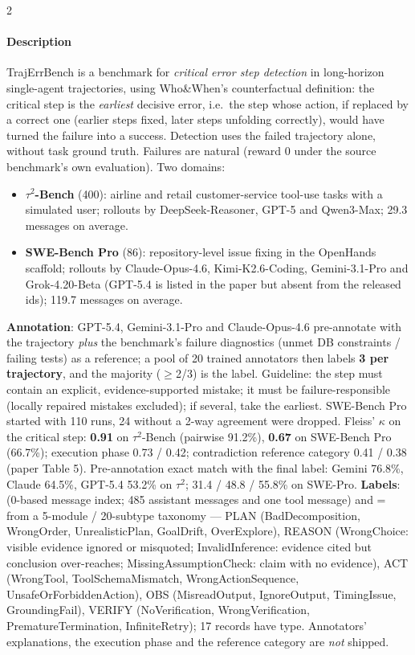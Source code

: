 \begin{multicols}{2}
\paragraph{Description} TrajErrBench is a benchmark for \emph{critical error step detection} in long-horizon single-agent trajectories, using Who\&When's counterfactual definition: the critical step is the \emph{earliest} decisive error, i.e.\ the step whose action, if replaced by a correct one (earlier steps fixed, later steps unfolding correctly), would have turned the failure into a success. Detection uses the failed trajectory alone, without task ground truth. Failures are natural (reward 0 under the source benchmark's own evaluation). Two domains:
\begin{itemize}
\item \textbf{$\tau^2$-Bench} (400): airline and retail customer-service tool-use tasks with a simulated user; rollouts by DeepSeek-Reasoner, GPT-5 and Qwen3-Max; 29.3 messages on average.
\item \textbf{SWE-Bench Pro} (86): repository-level issue fixing in the OpenHands scaffold; rollouts by Claude-Opus-4.6, Kimi-K2.6-Coding, Gemini-3.1-Pro and Grok-4.20-Beta (GPT-5.4 is listed in the paper but absent from the released ids); 119.7 messages on average.
\end{itemize}
\textbf{Annotation}: GPT-5.4, Gemini-3.1-Pro and Claude-Opus-4.6 pre-annotate with the trajectory \emph{plus} the benchmark's failure diagnostics (unmet DB constraints / failing tests) as a reference; a pool of 20 trained annotators then labels \textbf{3 per trajectory}, and the majority ($\ge$2/3) is the label. Guideline: the step must contain an explicit, evidence-supported mistake; it must be failure-responsible (locally repaired mistakes excluded); if several, take the earliest. SWE-Bench Pro started with 110 runs, 24 without a 2-way agreement were dropped. Fleiss' $\kappa$ on the critical step: \textbf{0.91} on $\tau^2$-Bench (pairwise 91.2\%), \textbf{0.67} on SWE-Bench Pro (66.7\%); execution phase 0.73 / 0.42; contradiction reference category 0.41 / 0.38 (paper Table 5). Pre-annotation exact match with the final label: Gemini 76.8\%, Claude 64.5\%, GPT-5.4 53.2\% on $\tau^2$; 31.4 / 48.8 / 55.8\% on SWE-Pro. \textbf{Labels}:  (0-based message index; 485 assistant messages and one tool message) and  =  from a 5-module / 20-subtype taxonomy --- PLAN (BadDecomposition, WrongOrder, UnrealisticPlan, GoalDrift, OverExplore), REASON (WrongChoice: visible evidence ignored or misquoted; InvalidInference: evidence cited but conclusion over-reaches; MissingAssumptionCheck: claim with no evidence), ACT (WrongTool, ToolSchemaMismatch, WrongActionSequence, UnsafeOrForbiddenAction), OBS (MisreadOutput, IgnoreOutput, TimingIssue, GroundingFail), VERIFY (NoVerification, WrongVerification, PrematureTermination, InfiniteRetry); 17 records have  type. Annotators' explanations, the execution phase and the reference category are \emph{not} shipped.


\end{multicols}
